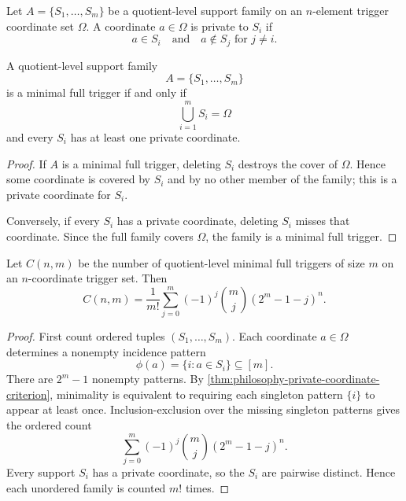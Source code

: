 \begin{definition}
\label{def:philosophy-private-trigger-coordinate}
Let $A=\{S_{1},\ldots,S_{m}\}$ be a quotient-level support family on an
$n$-element trigger coordinate set $\Omega$. A coordinate $a\in\Omega$
is private to $S_{i}$ if
$$
  a\in S_{i}
  \quad\text{and}\quad
  a\notin S_{j}\text{ for }j\neq i.
$$
\end{definition}

\begin{theorem}
\label{thm:philosophy-private-coordinate-criterion}
A quotient-level support family
$$
  A=\{S_{1},\ldots,S_{m}\}
$$
is a minimal full trigger if and only if
$$
  \bigcup_{i=1}^{m}S_{i}=\Omega
$$
and every $S_{i}$ has at least one private coordinate.
\end{theorem}
\begin{proof}
If $A$ is a minimal full trigger, deleting $S_{i}$ destroys the cover of
$\Omega$. Hence some coordinate is covered by $S_{i}$ and by no other
member of the family; this is a private coordinate for $S_{i}$.

Conversely, if every $S_{i}$ has a private coordinate, deleting $S_{i}$
misses that coordinate. Since the full family covers $\Omega$, the
family is a minimal full trigger.
\end{proof}

\begin{theorem}
\label{thm:philosophy-private-coordinate-enumeration}
Let $C(n,m)$ be the number of quotient-level minimal full triggers of
size $m$ on an $n$-coordinate trigger set. Then
$$
  C(n,m)
  =
  \frac{1}{m!}
  \sum_{j=0}^{m}
  (-1)^{j}
  \binom{m}{j}
  (2^{m}-1-j)^{n}.
$$
\end{theorem}
\begin{proof}
First count ordered tuples $(S_{1},\ldots,S_{m})$. Each coordinate
$a\in\Omega$ determines a nonempty incidence pattern
$$
  \phi(a)=\{i:a\in S_{i}\}\subseteq[m].
$$
There are $2^{m}-1$ nonempty patterns. By
\autoref{thm:philosophy-private-coordinate-criterion}, minimality is
equivalent to requiring each singleton pattern $\{i\}$ to appear at
least once. Inclusion-exclusion over the missing singleton patterns
gives the ordered count
$$
  \sum_{j=0}^{m}
  (-1)^{j}
  \binom{m}{j}
  (2^{m}-1-j)^{n}.
$$
Every support $S_{i}$ has a private coordinate, so the $S_{i}$ are
pairwise distinct. Hence each unordered family is counted $m!$ times.
\end{proof}

